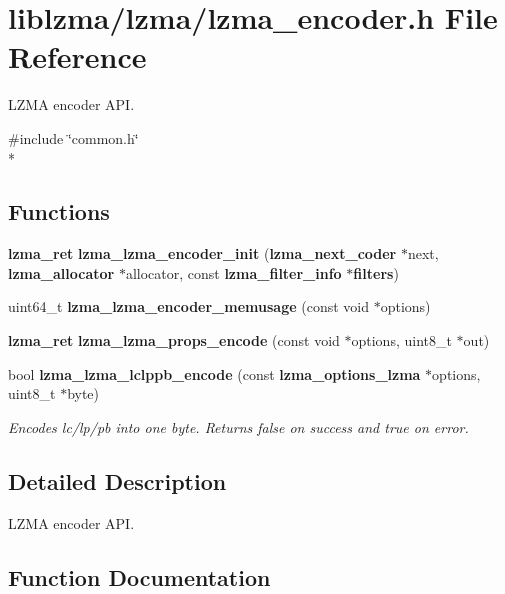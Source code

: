 \section{liblzma/lzma/lzma\-\_\-encoder.h File Reference}
\label{lzma__encoder_8h}


L\-Z\-M\-A encoder A\-P\-I.  


{\ttfamily \#include \char`\"{}common.\-h\char`\"{}}\\*
\subsection*{Functions}
\begin{DoxyCompactItemize}
\item 
{\bf lzma\-\_\-ret} {\bfseries lzma\-\_\-lzma\-\_\-encoder\-\_\-init} ({\bf lzma\-\_\-next\-\_\-coder} $\ast$next, {\bf lzma\-\_\-allocator} $\ast$allocator, const {\bf lzma\-\_\-filter\-\_\-info} $\ast${\bf filters})\label{lzma__encoder_8h_a0cfb66fbad445488fca8aea70655e528}

\item 
uint64\-\_\-t {\bfseries lzma\-\_\-lzma\-\_\-encoder\-\_\-memusage} (const void $\ast$options)\label{lzma__encoder_8h_a69751f4a64caf8d24a2f94b0301e04c2}

\item 
{\bf lzma\-\_\-ret} {\bfseries lzma\-\_\-lzma\-\_\-props\-\_\-encode} (const void $\ast$options, uint8\-\_\-t $\ast$out)\label{lzma__encoder_8h_a5f00e852ffad77bfde90803a36752c24}

\item 
bool {\bf lzma\-\_\-lzma\-\_\-lclppb\-\_\-encode} (const {\bf lzma\-\_\-options\-\_\-lzma} $\ast$options, uint8\-\_\-t $\ast$byte)
\begin{DoxyCompactList}\small\item\em Encodes lc/lp/pb into one byte. Returns false on success and true on error. \end{DoxyCompactList}\end{DoxyCompactItemize}


\subsection{Detailed Description}
L\-Z\-M\-A encoder A\-P\-I. 

\subsection{Function Documentation}
